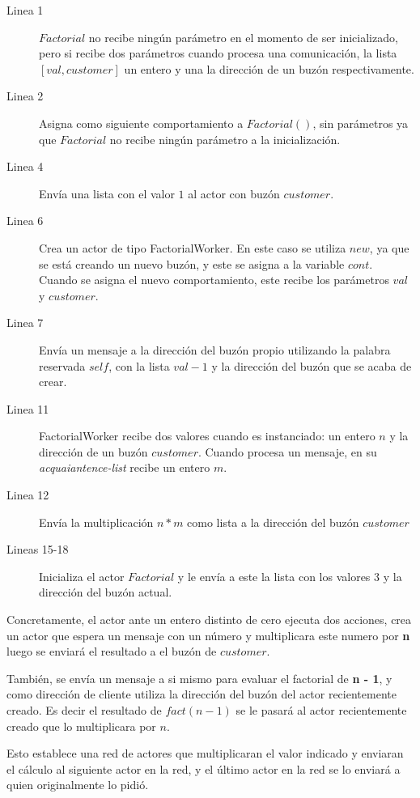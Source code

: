 \begin{description}

\item [Linea 1] $Factorial$ no recibe ningún parámetro en el momento de ser inicializado, pero si recibe dos parámetros cuando procesa una comunicación, la lista $[val, customer]$ un entero y una la dirección de un buzón respectivamente.
\item [Linea 2] Asigna como siguiente comportamiento a $Factorial()$, sin parámetros ya que $Factorial$ no recibe ningún parámetro a la inicialización.  
\item [Linea 4] Envía una lista con el valor $1$ al actor con buzón $customer$.
\item [Linea 6] Crea un actor de tipo FactorialWorker. En este caso se utiliza $new$, ya que se está creando un nuevo buzón, y este se asigna a la variable $cont$. Cuando se asigna el nuevo comportamiento, este recibe los parámetros $val$ y $customer$.
\item [Linea 7] Envía un mensaje a la dirección del buzón propio utilizando la palabra reservada $self$, con la lista $val - 1$ y la dirección del buzón que se acaba de crear.
\item [Linea 11] FactorialWorker recibe dos valores cuando es instanciado: un entero $n$ y la dirección de un buzón $customer$. Cuando procesa un mensaje, en su \textit{acquaiantence-list} recibe un entero $m$.
\item [Linea 12] Envía la multiplicación $n*m$ como lista a la dirección del buzón $customer$ 
\item [Lineas 15-18] Inicializa el actor $Factorial$ y le envía a este la lista con los valores $3$ y la dirección del buzón actual. 

\end{description}

Concretamente, el actor ante un entero distinto de cero ejecuta dos acciones, crea un actor que espera un mensaje con un número y multiplicara este numero por \textbf{n} luego se enviará el resultado a el buzón de $customer$.

También, se envía un mensaje a si mismo para evaluar el factorial de \textbf{n - 1}, y como dirección de cliente utiliza la dirección del buzón del actor recientemente creado. Es decir el resultado de $fact(n - 1)$ se le pasará al actor recientemente creado que lo multiplicara por $n$.

Esto establece una red de actores que multiplicaran el valor indicado y enviaran el cálculo al siguiente actor en la red, y el último actor en la red se lo enviará a quien originalmente lo pidió.

